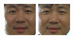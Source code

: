 \begin{figure}
\begin{center}
{\includegraphics[width=\columnwidth/12]{ch5/figures/00029_960530_fa.png}
\includegraphics[width=\columnwidth/12]{ch5/figures/00029_960620_fa.png}
}
\end{center}
\end{figure}
